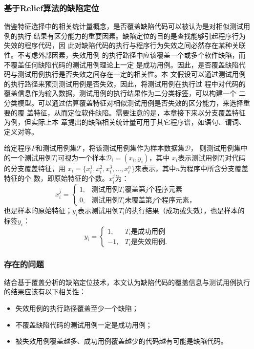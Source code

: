 \subsubsection{基于Relief算法的缺陷定位}
借鉴特征选择中的相关统计量概念，是否覆盖缺陷代码可以被认为是对相似测试用例的执行
结果有区分能力的重要因素。缺陷定位的目的是查找能够引起程序行为失效的程序代码，因
此对缺陷代码的执行与程序行为失效之间必然存在某种关联性。不考虑外部因素，失效用例
的执行路径中应该覆盖一个或多个软件缺陷，而不覆盖任何缺陷代码的测试用例理论上一定
是成功用例。因此，是否覆盖缺陷代码与测试用例执行是否失效之间存在一定的相关性。本
文假设可以通过测试用例的执行路径来预测测试用例是否失效，因此，将测试用例在执行过
程中对代码的覆盖信息作为输入数据，测试用例的执行结果作为二分类标签，可以构建一个
二分类模型。可以通过估算覆盖特征对相似测试用例是否失效的区分能力，来选择重要的覆
盖特征，从而定位软件缺陷。需要注意的是，本章接下来以分支覆盖特征为例，但实际上本
章提出的缺陷相关统计量可用于其它程序谱，如语句、谓词、定义对等。

给定程序$P$和测试用例集$\mathcal T$，将该测试用例集作为样本数据集$\mathcal D$，
则测试用例集中的一个测试用例$T_i$可视为一个样本$\mathcal D_i=(x_i,y_i)$，其中
$x_i$表示测试用例$T_i$对代码的分支覆盖特征，用
$x_i=\{x_i^1,x_i^2,x_i^3,...,x_i^n\}$来表示，其中$n$为程序中所含分支覆盖特征的个
数，即原始特征的个数。$x_i^j$为：
\begin{equation}\label{eq:cov}
      x_i^j = 
       \begin{cases}
             1, & \mbox{测试用例}T_i\mbox{覆盖第}j\mbox{个程序元素}\\ 
  0, & \mbox{测试用例}T_i\mbox{未覆盖第}j\mbox{个程序元素}，  
       \end{cases}
\end{equation}
也是样本的原始特征；$y_i$表示测试用例$T_i$的执行结果（成功或失效），也是样本的标签$y_i$：
\begin{equation}
      y_i = 
       \begin{cases}
             1, & T_i\mbox{是成功用例}\\ 
  -1, & T_i\mbox{是失效用例}.  
       \end{cases}
\end{equation}

\subsubsection{存在的问题}

结合基于覆盖分析的缺陷定位技术，本文认为缺陷代码的覆盖信息与测试用例执行的结果应该有以下相关性：
\begin{itemize}
      \item 失效用例的执行路径覆盖至少一个缺陷；
      \item 不覆盖缺陷代码的测试用例一定是成功用例；
      \item 被失效用例覆盖越多、成功用例覆盖越少的代码越有可能是缺陷代码。
\end{itemize}

